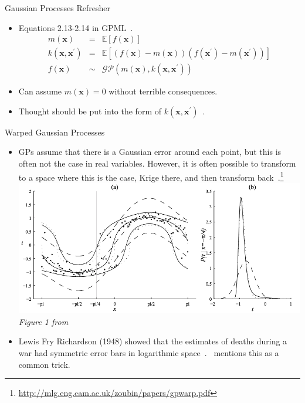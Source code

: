 \begin{frame}{Gaussian Processes Refresher}
\vspace{-20pt}
\begin{itemize}
\item Equations 2.13-2.14 in GPML~\cite{williams2006gaussian}.
\begin{align}
m(\mathbf{x})&=&\mathbb{E}[f(\mathbf{x})] %
\\
k\left(\mathbf{x}, \mathbf{x}^{\prime}\right)&=&\mathbb{E}
\left[(f(\mathbf{x})-m(\mathbf{x}))\left(f\left(\mathbf{x}^{\prime}\right)
-m\left(\mathbf{x}^{\prime}\right)\right)\right]
\\
f(\mathbf{x})& \sim& \mathcal{G} \mathcal{P}\left(m(\mathbf{x}),
 k\left(\mathbf{x}, \mathbf{x}^{\prime}\right)\right)%
\end{align}
\item Can assume $m(\mathbf{x})=0$ without terrible consequences.
 \item Thought should be put into the form of $k\left(\mathbf{x},
  \mathbf{x}^{\prime}\right)$~\cite{duvenaud2014automatic}.
\end{itemize}
\end{frame}

\begin{frame}{Warped Gaussian Processes}
\vspace{-20pt}
\begin{itemize}
\item GPs assume that there is a Gaussian error around each point,
      but this is often not the case in real variables.
      However, it is often possible to transform to
      a space where this is the case, Krige there,
      and then transform
      back~\cite{snelson2004warped}.\footnote{\url{http://mlg.eng.cam.ac.uk/zoubin/papers/gpwarp.pdf}}
      \includegraphics[width=0.7\linewidth]{images/example-images/warped-example.png}\\
      \textit{Figure 1 from~\cite{snelson2004warped}}
\item Lewis Fry Richardson (1948) showed that the estimates
      of deaths during a war had
      symmetric error bars in logarithmic space~\cite{richardson1948variation}.
      \cite{snelson2004warped}~mentions this as a common trick.
 \end{itemize}

\end{frame}


